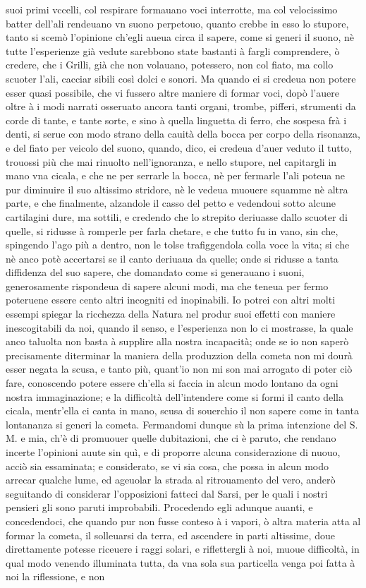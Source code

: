 \documentclass[11pt,twoside,openany]{book}
\begin{document}
suoi primi vccelli, col respirare formauano voci interrotte, ma col velocissimo batter dell'ali rendeuano vn suono perpetouo, quanto crebbe in esso lo stupore, tanto si scemò l'opinione ch'egli aueua circa il sapere, come si generi il suono, nè tutte l'esperienze già vedute sarebbono state bastanti à fargli comprendere, ò credere, che i Grilli, già che non volauano, potessero, non col fiato, ma collo scuoter l'ali, cacciar sibili così dolci e sonori. Ma quando ei si credeua non potere esser quasi possibile, che vi fussero altre maniere di formar voci, dopò l'auere oltre à i modi narrati osseruato ancora tanti organi, trombe, pifferi, strumenti da corde di tante, e tante sorte, e sino à quella linguetta di ferro, che sospesa frà i denti, si serue con modo strano della cauità della bocca per corpo della risonanza, e del fiato per veicolo del suono, quando, dico, ei credeua d'auer veduto il tutto, trouossi più che mai rinuolto nell'ignoranza, e nello stupore, nel capitargli in mano vna cicala, e che ne per serrarle la bocca, nè per fermarle l'ali poteua ne pur diminuire il suo altissimo stridore, nè le vedeua muouere squamme nè altra parte, e che finalmente, alzandole il casso del petto e vedendoui sotto alcune cartilagini dure, ma sottili, e credendo che lo strepito deriuasse dallo scuoter di quelle, si ridusse à romperle per farla chetare, e che tutto fu in vano, sin che, spingendo l'ago più a dentro, non le tolse trafiggendola colla voce la vita; si che nè anco potè accertarsi se il canto deriuaua da quelle; onde si ridusse a tanta diffidenza del suo sapere, che domandato come si generauano i suoni, generosamente rispondeua di sapere alcuni modi, ma che teneua per fermo poteruene essere cento altri incogniti ed inopinabili. Io potrei con altri molti essempi spiegar la ricchezza della Natura nel produr suoi effetti con maniere inescogitabili da noi, quando il senso, e l'esperienza non lo ci mostrasse, la quale anco taluolta non basta à supplire alla nostra incapacità; onde se io non saperò precisamente diterminar la maniera della produzzion della cometa non mi dourà esser negata la scusa, e tanto più, quant'io non mi son mai arrogato di poter ciò fare, conoscendo potere essere ch'ella si faccia in alcun modo lontano da ogni nostra immaginazione; e la difficoltà dell'intendere come si formi il canto della cicala, mentr'ella ci canta in mano, scusa di souerchio il non sapere come in tanta lontananza si generi la cometa. Fermandomi dunque sù la prima intenzione del S. M. e mia, ch'è di promuouer quelle dubitazioni, che ci è paruto, che rendano incerte l'opinioni auute sin quì, e di proporre alcuna considerazione di nuouo, acciò sia essaminata; e considerato, se vi sia cosa, che possa in alcun modo arrecar qualche lume, ed ageuolar la strada al ritrouamento del vero, anderò seguitando di considerar l'opposizioni fatteci dal Sarsi, per le quali i nostri pensieri gli sono paruti improbabili. Procedendo egli adunque auanti, e concedendoci, che quando pur non fusse conteso à i vapori, ò altra materia atta al formar la cometa, il solleuarsi da terra, ed ascendere in parti altissime, doue direttamente potesse riceuere i raggi solari, e riflettergli à noi, muoue difficoltà, in qual modo venendo illuminata tutta, da vna sola sua particella venga poi fatta à noi la riflessione, e non 
\end{document}
